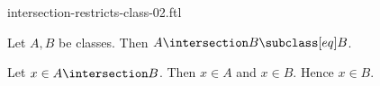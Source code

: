 \documentclass{article}
\begin{document}
\begin{smodule}[creators={Marcel Schütz}]{intersection-restricts-class-02.ftl}

  \begin{fproposition*}[label=8287827479494656]
    Let $A, B$ be classes.
    Then $A \intersection B \subclass[eq] B$.
  \end{fproposition*}
  \begin{fproof}
    Let $x \in A \intersection B$.
    Then $x \in A$ and $x \in B$.
    Hence $x \in B$.
  \end{fproof}
\end{smodule}
\end{document}
